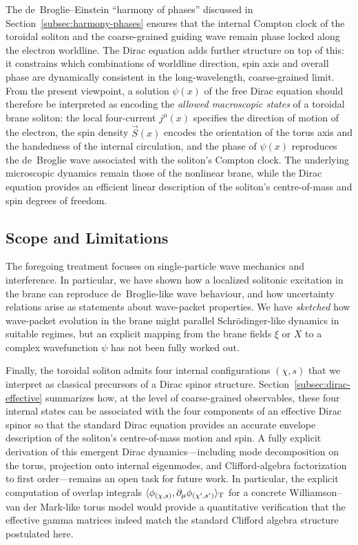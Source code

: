 The de~Broglie--Einstein ``harmony of phases'' discussed in
Section~\ref{subsec:harmony-phases} ensures that the internal Compton
clock of the toroidal soliton and the coarse-grained guiding wave
remain phase locked along the electron worldline. The Dirac equation
adds further structure on top of this: it constrains which combinations
of worldline direction, spin axis and overall phase are dynamically
consistent in the long-wavelength, coarse-grained limit. From the
present viewpoint, a solution $\psi(x)$ of the free Dirac equation
should therefore be interpreted as encoding the \emph{allowed macroscopic
states} of a toroidal brane soliton: the local four-current
$j^\mu(x)$ specifies the direction of motion of the electron, the spin
density $\vec S(x)$ encodes the orientation of the torus axis and the
handedness of the internal circulation, and the phase of $\psi(x)$
reproduces the de~Broglie wave associated with the soliton's Compton
clock. The underlying microscopic dynamics remain those of the
nonlinear brane, while the Dirac equation provides an efficient
linear description of the soliton's centre-of-mass and spin degrees of
freedom.


\subsection{Scope and Limitations}\label{scope-and-limitations}

The foregoing treatment focuses on single-particle wave mechanics and
interference. In particular, we have shown how a localized solitonic
excitation in the brane can reproduce de~Broglie-like wave behaviour,
and how uncertainty relations arise as statements about wave-packet
properties. We have \emph{sketched} how wave-packet evolution in the
brane might parallel Schrödinger-like dynamics in suitable regimes, but
an explicit mapping from the brane fields $\xi$ or $X$ to a complex
wavefunction $\psi$ has not been fully worked out.

Finally, the toroidal soliton admits four internal configurations
$(\chi,s)$ that we interpret as classical precursors of a Dirac spinor
structure. Section~\ref{subsec:dirac-effective} summarizes how, at the
level of coarse-grained observables, these four internal states can be
associated with the four components of an effective Dirac spinor so
that the standard Dirac equation provides an accurate envelope
description of the soliton's centre-of-mass motion and spin. A fully
explicit derivation of this emergent Dirac dynamics---including mode
decomposition on the torus, projection onto internal eigenmodes, and
Clifford-algebra factorization to first order---remains an open task
for future work. In particular, the explicit computation of overlap
integrals $\langle\phi_{(\chi,s)},\partial_\mu\phi_{(\chi',s')}\rangle_{\rm T}$
for a concrete Williamson--van der Mark-like torus model would provide
a quantitative verification that the effective gamma matrices indeed
match the standard Clifford algebra structure postulated here.

